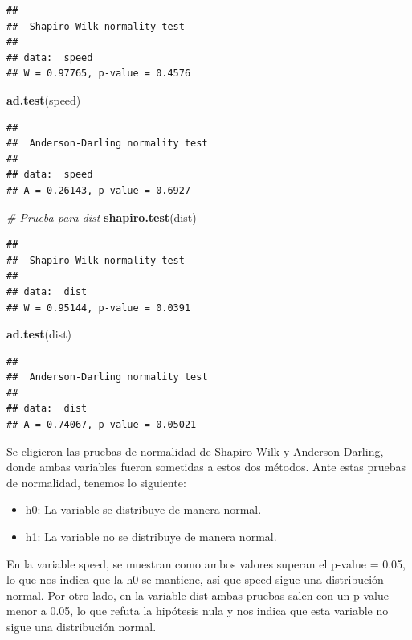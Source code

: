 \documentclass[
]{article}
\newenvironment{Shaded}{\begin{snugshade}}{\end{snugshade}}
\newcommand{\CommentTok}[1]{\textcolor[rgb]{0.56,0.35,0.01}{\textit{#1}}}
\newcommand{\FunctionTok}[1]{\textcolor[rgb]{0.13,0.29,0.53}{\textbf{#1}}}
\newcommand{\NormalTok}[1]{#1}
\providecommand{\tightlist}{%
  \setlength{\itemsep}{0pt}\setlength{\parskip}{0pt}}
\begin{document}
\begin{verbatim}
## 
##  Shapiro-Wilk normality test
## 
## data:  speed
## W = 0.97765, p-value = 0.4576
\end{verbatim}

\begin{Shaded}
\begin{Highlighting}[]
\FunctionTok{ad.test}\NormalTok{(speed)}
\end{Highlighting}
\end{Shaded}

\begin{verbatim}
## 
##  Anderson-Darling normality test
## 
## data:  speed
## A = 0.26143, p-value = 0.6927
\end{verbatim}

\begin{Shaded}
\begin{Highlighting}[]
\CommentTok{\# Prueba para \textquotesingle{}dist\textquotesingle{}}
\FunctionTok{shapiro.test}\NormalTok{(dist)}
\end{Highlighting}
\end{Shaded}

\begin{verbatim}
## 
##  Shapiro-Wilk normality test
## 
## data:  dist
## W = 0.95144, p-value = 0.0391
\end{verbatim}

\begin{Shaded}
\begin{Highlighting}[]
\FunctionTok{ad.test}\NormalTok{(dist)}
\end{Highlighting}
\end{Shaded}

\begin{verbatim}
## 
##  Anderson-Darling normality test
## 
## data:  dist
## A = 0.74067, p-value = 0.05021
\end{verbatim}

Se eligieron las pruebas de normalidad de Shapiro Wilk y Anderson
Darling, donde ambas variables fueron sometidas a estos dos métodos.
Ante estas pruebas de normalidad, tenemos lo siguiente:

\begin{itemize}
\tightlist
\item
  h0: La variable se distribuye de manera normal.
\item
  h1: La variable no se distribuye de manera normal.
\end{itemize}

En la variable speed, se muestran como ambos valores superan el p-value
= 0.05, lo que nos indica que la h0 se mantiene, así que speed sigue una
distribución normal. Por otro lado, en la variable dist ambas pruebas
salen con un p-value menor a 0.05, lo que refuta la hipótesis nula y nos
indica que esta variable no sigue una distribución normal.
\end{document}
